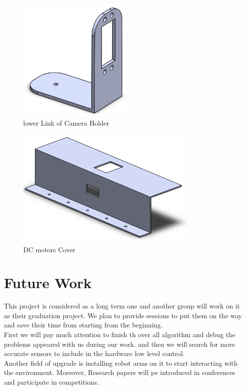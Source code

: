 \documentclass[12pt]{book}
\begin{document}
\begin{figure}
	\centering
	\includegraphics[width =0.5\textwidth]{Fig/solid/cam-holder-1.png}
	\caption{lower Link of Camera Holder}
\end{figure}


\begin{figure}
	\centering
	\includegraphics[width =0.8\textwidth]{Fig/solid/Motor-cover.png}
	\caption{DC motors Cover}
\end{figure}




\chapter{Future Work}
This project is considered as a long term one and another group will work on it as their graduation project. We plan to provide sessions to put them on the way and save their time from starting from the beginning.\\

\noindent First we will pay much attention to finish th over all algorithm and debug the problems appeared with us during our work. and then we will search for more accurate sensors to include in the hardware low level control. \\

\noindent Another field of upgrade is installing robot arms on it to start interacting with the environment. Moreover, Research papers will pe introduced in conferences and participate in competitions.


 


\end{document}
